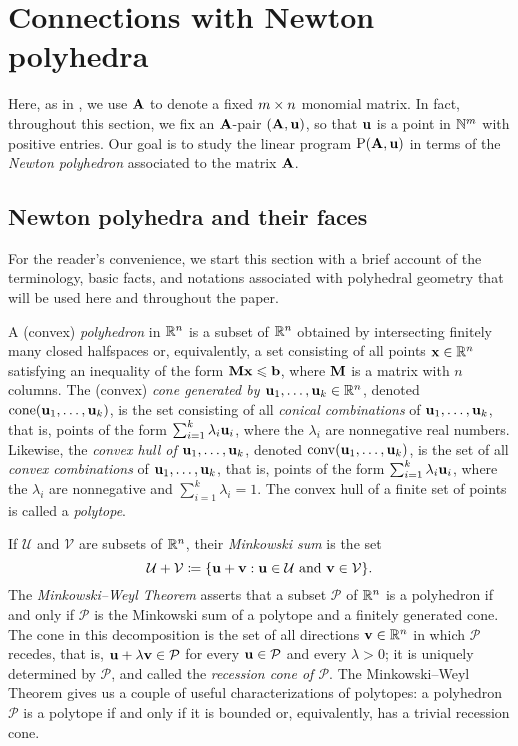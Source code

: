 \documentclass{amsart}
\begin{document}
\section{Connections with Newton polyhedra}
\label{s: newton}
Here, as in ,  we use $\mathbf{A}$ to denote a fixed $m \times n$ monomial matrix.
In fact, throughout this section, we fix an $\mathbf{A}$-pair $(\mathbf{A}, \mathbf{u})$, so that $\mathbf{u}$ is a point in $\mathbb{N}^m$ with positive entries.
Our goal is to study the linear program $\mathrm{P}(\mathbf{A}, \mathbf{u})$ in terms of the \emph{Newton polyhedron} associated to the matrix $\mathbf{A}$.

\subsection{Newton polyhedra and their faces}

For the reader's convenience, we start this section with a brief account of the terminology, basic facts, and notations associated with polyhedral geometry that will be used here and throughout the paper.

A (convex) \emph{polyhedron} in $\mathbb{R}^n$ is a subset of $\mathbb{R}^n$ obtained by intersecting finitely many closed halfspaces or, equivalently, a set consisting of all points $\mathbf{x}\in \mathbb{R}^n$ satisfying an inequality of the form $\mathbf{M}\mathbf{x}\leqslant \mathbf{b}$, where $\mathbf{M}$ is a matrix with $n$ columns.
The (convex) \emph{cone generated by $\mathbf{u}_1,\ldots,\mathbf{u}_k \in \mathbb{R}^n$}, denoted $\operatorname{cone}(\mathbf{u}_1,\ldots,\mathbf{u}_k)$, is the set consisting of all \emph{conical combinations} of $\mathbf{u}_1, \ldots, \mathbf{u}_k$, that is, points of the form $\sum_{i=1}^k \lambda_i \mathbf{u}_i$, where the $\lambda_i$ are nonnegative real numbers.
Likewise, the \emph{convex hull of $\mathbf{u}_1,\ldots,\mathbf{u}_k$}, denoted $\operatorname{conv}(\mathbf{u}_1,\ldots,\mathbf{u}_k)$, is the set of all \emph{convex combinations} of $\mathbf{u}_1, \ldots, \mathbf{u}_k$, that is, points of the form $\sum_{i=1}^k \lambda_i \mathbf{u}_i$, where the $\lambda_i$ are nonnegative and $\sum_{i=1}^k \lambda_i = 1$.
The convex hull of a finite set of points is called a \emph{polytope}.

If $\mathcal{U}$ and $\mathcal{V}$ are subsets of $\mathbb{R}^n$, their \emph{Minkowski sum} is the set
\[\mathcal{U}+\mathcal{V} \coloneqq \{\mathbf{u}+\mathbf{v}: \mathbf{u}\in \mathcal{U}\text{ and }\mathbf{v}\in \mathcal{V}\}.\]
The \emph{Minkowski--Weyl Theorem} asserts that a subset $\mathcal{P}$ of $\mathbb{R}^n$ is a polyhedron if and only if $\mathcal{P}$ is the Minkowski sum of a polytope and a finitely generated cone.
The cone in this decomposition is the set of all directions $\mathbf{v} \in \mathbb{R}^n$ in which $\mathcal{P}$ recedes, that is, $\mathbf{u} + \lambda \mathbf{v} \in \mathcal{P}$ for every $\mathbf{u} \in \mathcal{P}$ and every $\lambda > 0$; it is uniquely determined by $\mathcal{P}$, and called the \emph{recession cone of $\mathcal{P}$}.
The Minkowski--Weyl Theorem gives us a couple of useful characterizations of polytopes: a polyhedron $\mathcal{P}$ is a polytope if and only if it is bounded or, equivalently, has a trivial recession cone.
\end{document}
